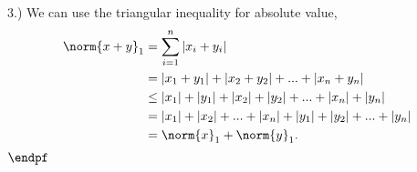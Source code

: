 \documentclass{report}
\begin{document}
    3.) We can use the triangular inequality for absolute value,
    \begin{align*}
        \norm{x + y}_1 &= \sum_{i=1}^{n} \left\lvert x_{i} + y_{i} \right\rvert \\
                     &= \left\lvert x_{1} + y_{1} \right\rvert + \left\lvert x_{2} + y_{2} \right\rvert + ... + \left\lvert x_{n} + y_{n} \right\rvert \\
                     &\leq \left\lvert x_{1} \right\rvert + \left\lvert y_{1} \right\rvert + \left\lvert x_{2} \right\rvert + \left\lvert y_{2} \right\rvert + ... + \left\lvert x_{n} \right\rvert + \left\lvert y_{n} \right\rvert \\
                     &= \left\lvert x_{1} \right\rvert + \left\lvert x_{2} \right\rvert + ... + \left\lvert x_{n} \right\rvert + \left\lvert y_{1} \right\rvert + \left\lvert y_{2} \right\rvert + ... + \left\lvert y_{n} \right\rvert \\
                     &= \norm{x}_1 + \norm{y}_1
    .\end{align*}
    $\endpf$

    
\end{document}
